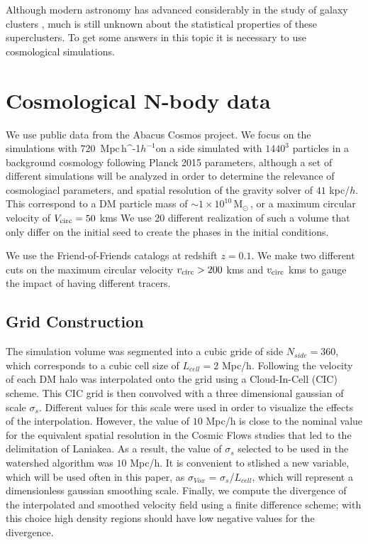 \documentclass[usenatbib]{mnras}
\newcommand{\Msun}{\,{\rm M}$_{\odot}$\,}
\newcommand{\Mpch}{\,{\rm Mpc}\,\ifmmode h^{-1}\else $h^{-1}$\fi}
\begin{document}
Although modern astronomy has advanced considerably in the study of galaxy clusters \cite{TheDeepUniverse}, much is still unknown about the statistical properties of these superclusters. To get some answers in this topic it is necessary to use cosmological simulations.


\section{Cosmological N-body data}

We use public data from the Abacus Cosmos project. 
We focus on the simulations with $720$ \Mpch on a side simulated with $1440^3$
particles in a background cosmology following Planck 2015 parameters, although a set of different simulations will be analyzed in order to determine the relevance of cosmologiacl parameters, and spatial resolution
of the gravity solver of $41$ kpc/$h$.
This correspond to a DM particle mass of $\sim 1 \times 10^{10}$\Msun, 
or a maximum circular velocity of $V_{\rm circ}=50$ kms
We use 20 different realization of such a volume that only differ on the initial seed to create the phases in the initial conditions.

We use the Friend-of-Friends catalogs at redshift $z=0.1$.
We make two different cuts on the maximum circular velocity $v_{\rm circ}>200$ kms and $v_{\rm circ}$ kms to gauge the impact of having different tracers.


\subsection{Grid Construction}  

The simulation volume was segmented into a cubic gride of side $N_{side}=360$, 
which corresponds to a cubic cell size of $L_{cell}=2$ Mpc/h.
Following \cite{2014Natur.513...71T} the velocity of each DM halo was interpolated onto the
grid using a Cloud-In-Cell (CIC) scheme. 
This CIC grid is then convolved with a three dimensional gaussian of scale $\sigma_s$.
Different values for this scale were used in order to visualize the effects of the interpolation. However, the value of $10$ Mpc/h is close to the nominal value for the equivalent spatial resolution
in the Cosmic Flows studies that led to the delimitation of Laniakea. As a result, the value of $\sigma_s$ selected to be used in the watershed algorithm was $10$ Mpc/h. It is convenient to stlished a new variable, which will be used often in this paper, as $\sigma_{Vox}$ = $\sigma_s$/$L_{cell}$, which will represent a dimensionless gaussian smoothing scale. 
Finally, we compute the divergence of the interpolated and smoothed velocity field using a
finite difference scheme; with this choice high density regions should have low negative
values for the divergence.
\end{document}
